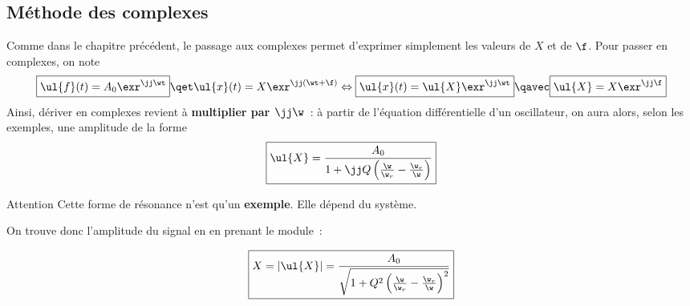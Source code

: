 \documentclass[../main/main.tex]{subfiles}
\begin{document}
\subsection{Méthode des complexes}
Comme dans le chapitre précédent, le passage aux complexes permet d'exprimer
simplement les valeurs de $X$ et de $\f$. Pour passer en complexes, on note
\begin{gather*}
    \boxed{\ul{f}(t) = A_0\exr^{\jj\wt}}
    \qet
    \ul{x}(t) = X\exr^{\jj(\wt+\f)}
    \Leftrightarrow
    \boxed{\ul{x}(t) = \ul{X}\exr^{\jj\wt}}
    \qavec
    \boxed{\ul{X} = X\exr^{\jj\f}}
\end{gather*}
Ainsi, dériver en complexes revient à \textbf{multiplier par $\jj\w$}~: à partir
de l'équation différentielle d'un oscillateur, on aura alors, selon les
exemples, une amplitude de la forme
\[\boxed{
        \ul{X}
        = \frac{A_0}{1 + \jj Q \left( \frac{\w}{\w_r} - \frac{\w_r}{\w} \right)}
}\]

\begin{rror}{Attention}
    Cette forme de résonance n'est qu'un \textbf{exemple}. Elle dépend du
    système.
\end{rror}

On trouve donc l'amplitude du signal en en prenant le module~:

\[\boxed{
        X
        = \left| \ul{X} \right|
        = \frac{A_0}{\sqrt{1 + Q^2\left( \frac{\w}{\w_r} - \frac{\w_r}{\w}
        \right)^2}}
}\]
\end{document}
